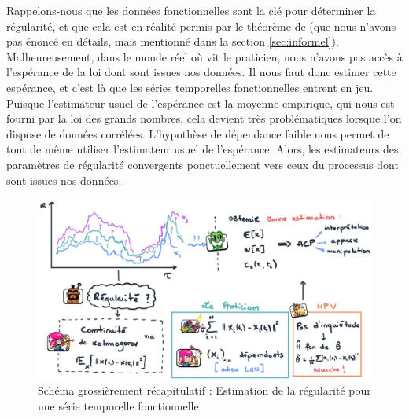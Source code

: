 
Rappelons-nous que les données fonctionnelles sont la clé pour déterminer la régularité, et que cela est en réalité permis par le théorème de  (que nous n'avons pas énoncé en détails, mais mentionné dans la section \ref{sec:informel}). Malheureusement, dans le monde réel où vit le praticien, nous n'avons pas accès à l'espérance de la loi dont sont issues nos données. Il nous faut donc estimer cette espérance, et c'est là que les séries temporelles fonctionnelles entrent en jeu. Puisque l'estimateur usuel de l'espérance est la moyenne empirique, qui nous est fourni par la loi des grands nombres, cela devient très problématiques lorsque l'on dispose de données corrélées.
L'hypothèse de dépendance faible nous permet de tout de même utiliser l'estimateur usuel de l'espérance. Alors, les estimateurs des paramètres de régularité convergents ponctuellement vers ceux du processus dont sont issues nos données.

\begin{figure}[H]
	\centering
	\includegraphics[width=\textwidth]{Images/sketches/schema_ts_estim_reg.jpg}
	\caption{Schéma grossièrement récapitulatif : Estimation de la régularité pour une série temporelle fonctionnelle}
	\label{fig:recap_estim_reg_fts}
\end{figure}
